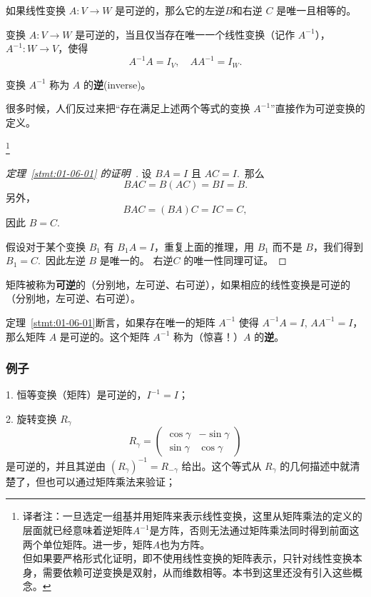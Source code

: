 \begin{theorem}\label{stmt:01-06-01} 如果线性变换 $A: V \to W$ 是可逆的，那么它的左逆$B$和右逆 $C$ 是唯一且相等的。\end{theorem}

\begin{corollary*}
变换 $A: V \to W$ 是可逆的，当且仅当存在唯一一个线性变换（记作 $A^{-1}$），$A^{-1}: W \to V$，使得 $$A^{-1} A = I_V,\quad A A^{-1} = I_W.$$
\end{corollary*}

变换 $A^{-1}$ 称为 $A$ 的\textbf{逆}(inverse)。

\begin{remark*}
很多时候，人们反过来把“存在满足上述两个等式的变换 $A^{-1}$”直接作为可逆变换的定义。
\end{remark*}\footnote{
译者注：一旦选定一组基并用矩阵来表示线性变换，这里从矩阵乘法的定义的层面就已经意味着逆矩阵$A^{-1}$是方阵，否则无法通过矩阵乘法同时得到前面这两个单位矩阵。进一步，矩阵$A$也为方阵。\\
但如果要严格形式化证明，即不使用线性变换的矩阵表示，只针对线性变换本身，需要依赖可逆变换是双射，从而维数相等。本书到这里还没有引入这些概念。
}

\begin{proof}[\normalfont\heiti 定理~\ref{stmt:01-06-01} 的证明~\nopunct]设 $BA = I$ 且 $AC = I$.~那么
$$BAC = B(AC) = BI = B.$$
另外，
$$BAC = (BA)C = IC = C,$$
因此 $B = C$.~

假设对于某个变换 $B_1$ 有 $B_1 A = I$，重复上面的推理，用 $B_1$ 而不是 $B$，我们得到 $B_1 = C$.~因此左逆 $B$ 是唯一的。 右逆$C$ 的唯一性同理可证。\end{proof}

\begin{definition*}
矩阵被称为\textbf{可逆}的（分别地，左可逆、右可逆），如果相应的线性变换是可逆的（分别地，左可逆、右可逆）。
\end{definition*}

定理~\ref{stmt:01-06-01}断言，如果存在唯一的矩阵 $A^{-1}$ 使得 $A^{-1} A = I$, $A A^{-1} = I$，那么矩阵 $A$ 是可逆的。这个矩阵 $A^{-1}$ 称为（惊喜！）$A$ 的\textbf{逆}。

\subsubsection{例子}\label{sec:01-06-02-01}

1. 恒等变换（矩阵）是可逆的，$I^{-1} = I$；

2. 旋转变换 $R_\gamma$
$$R_\gamma = \begin{pmatrix} \cos \gamma & -\sin \gamma \\ \sin \gamma & \cos \gamma \end{pmatrix}$$
是可逆的，并且其逆由 $(R_\gamma)^{-1} = R_{-\gamma}$ 给出。这个等式从 $R_\gamma$ 的几何描述中就清楚了，但也可以通过矩阵乘法来验证；

